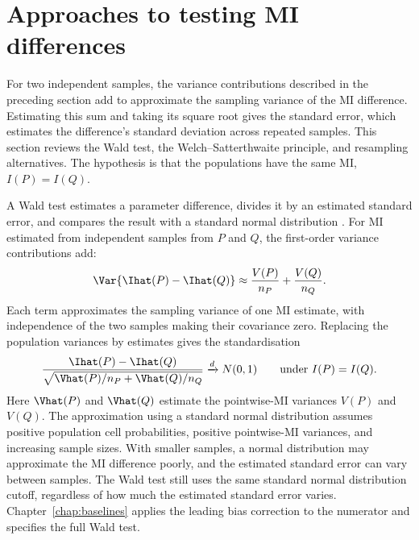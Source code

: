 \section{Approaches to testing MI differences}
\allowdisplaybreaks
\label{sec:welch-background}

For two independent samples, the variance contributions described in the
preceding section add to approximate the sampling variance of the MI
difference. Estimating this sum and taking its square root gives the
standard error, which estimates the difference's standard deviation across
repeated samples. This section
reviews the Wald test, the Welch--Satterthwaite principle, and resampling
alternatives. The hypothesis is that the populations
have the same MI, \(I(P)=I(Q)\).


A Wald test estimates a parameter difference, divides it by an estimated
standard error, and compares the result with a standard normal distribution
\citep{wald1943,vanderVaart1998}.
For MI estimated from independent samples from \(P\) and \(Q\), the
first-order variance contributions add:
\begin{equation}
  \Var\{\Ihat(P)-\Ihat(Q)\}
  \approx \frac{V(P)}{n_P}+\frac{V(Q)}{n_Q}.
  \label{eq:background-two-sample-variance}
\end{equation}
Each term approximates the sampling variance of one MI estimate, with
independence of the two samples making their covariance zero. Replacing
the population variances by estimates gives the standardisation
\begin{equation}
  \frac{\Ihat(P)-\Ihat(Q)}
       {\sqrt{\Vhat(P)/n_P+\Vhat(Q)/n_Q}}
  \xrightarrow{d}N(0,1)
  \qquad\text{under }I(P)=I(Q).
  \label{eq:background-wald-standardisation}
\end{equation}
Here \(\Vhat(P)\) and \(\Vhat(Q)\) estimate the pointwise-MI variances
\(V(P)\) and \(V(Q)\). The approximation using a standard normal distribution
assumes positive population cell probabilities, positive pointwise-MI
variances, and increasing sample sizes. With smaller samples, a normal
distribution may approximate the MI difference poorly, and the estimated
standard error can vary between samples. The Wald test still uses the same standard normal distribution
cutoff, regardless of how much the estimated standard error varies.
Chapter~\ref{chap:baselines} applies the leading bias correction to the
numerator and specifies the full Wald test.

\medskip
{}

